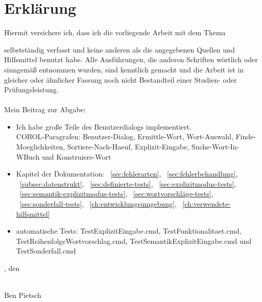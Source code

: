 \chapter{Erklärung}\label{ch:erklaerung}

Hiermit versichere ich, dass ich die vorliegende Arbeit mit dem Thema
\begin{quote}
    \textit{\titleDocument}
\end{quote}
selbstständig verfasst und keine anderen als die angegebenen Quellen und Hilfsmittel benutzt habe.
Alle Ausführungen, die anderen Schriften wörtlich oder sinngemäß entnommen wurden, sind kenntlich gemacht und die Arbeit ist in gleicher oder ähnlicher Fassung noch nicht Bestandteil einer Studien- oder Prüfungsleistung.
\\
\\
Mein Beitrag zur Abgabe:
\begin{itemize}[noitemsep]
    \item Ich habe große Teile des Benutzerdialogs implementiert.\\
    COBOL-Paragrafen: \glqq Benutzer-Dialog\grqq{},  \glqq Ermittle-Wort\grqq{},  \glqq Wort-Auswahl\grqq{},  \glqq Finde-Moeglichkeiten\grqq{}, \glqq Sortiere-Nach-Haeuf\grqq{}, \glqq Explizit-Eingabe\grqq{}, \glqq Suche-Wort-In-WBuch\grqq{} und \glqq Konstruiere-Wort\grqq{}
    \item Kapitel der Dokumentation: ~\ref{sec:fehlerarten}, ~\ref{sec:fehlerbehandlung}, ~\ref{subsec:datenstrukt}, ~\ref{sec:definierte-tests}, ~\ref{sec:explizitmodus-tests}, ~\ref{sec:semantik-explizitmodus-tests},
    ~\ref{sec:wortvorschläge-tests}, ~\ref{sec:sonderfall-tests}, ~\ref{ch:entwicklungsumgebung}, ~\ref{ch:verwendete-hilfsmittel}
    \item automatische Tests: TestExplizitEingabe.cmd, TestFunktionalitaet.cmd, TestReihenfolgeWortvorschlag.cmd, TestSemantikExplizitEingabe.cmd und TestSonderfall.cmd
\end{itemize}
\vspace*{2cm}

\begingroup
\setlength{\parindent}{0pt} %

\locationDocument, den \dateDocument
\bigskip
\bigskip

\newlength{\widthbox}
\settowidth{\widthbox}{\locationDocument, den \dateDocument}

\makebox[\widthbox]{\hrulefill}\\
Ben Pietsch
\endgroup
\newpage

